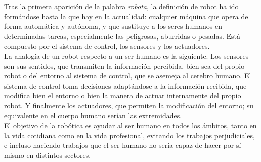 Tras la primera aparición de la palabra \textit{robota}, la definición de robot ha ido formándose hasta la que hay en la actualidad:  cualquier máquina que opera de forma automática y autónoma, y que sustituye a los seres humanos en determinadas tareas, especialmente las peligrosas, aburridas o pesadas. Está compuesto por el sistema de control, los sensores y los actuadores.\\

La analogía de un robot respecto a un ser humano es la siguiente. Los sensores son sus sentidos, que transmiten la información percibida, bien sea del propio robot o del entorno al sistema de control, que se asemeja al cerebro humano. El sistema de control toma decisiones adaptándose a la información recibida, que modifica bien el entorno o bien la manera de actuar internamente del propio robot. Y finalmente los actuadores, que permiten la modificación del entorno; su equivalente en el cuerpo humano serían las extremidades.\\

El objetivo de la robótica es ayudar al ser humano en todos los ámbitos, tanto en la vida cotidiana como en la vida profesional, evitando los trabajos perjudiciales, e incluso haciendo trabajos que el ser humano no sería capaz de hacer por sí mismo en distintos sectores.\\

